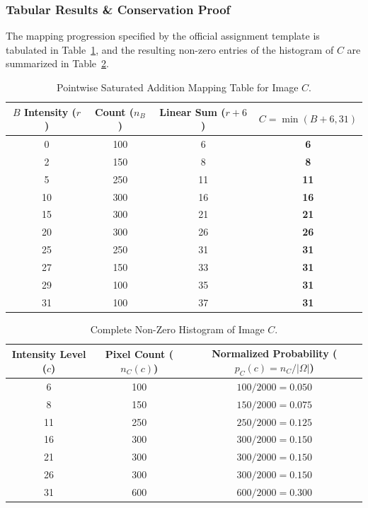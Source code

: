 \documentclass[11pt,a4paper]{article}
\begin{document}
\subsubsection{Tabular Results \& Conservation Proof}
The mapping progression specified by the official assignment template is tabulated in Table~\ref{tab:p1_mapping}, and the resulting non-zero entries of the histogram of $C$ are summarized in Table~\ref{tab:p1_hist_C}.

\begin{table}[htbp]
\centering
\caption{Pointwise Saturated Addition Mapping Table for Image $C$.}
\label{tab:p1_mapping}
\small
\begin{tabular}{cccc}
\toprule
\textbf{$B$ Intensity ($r$)} & \textbf{Count ($n_B$)} & \textbf{Linear Sum ($r + 6$)} & \textbf{$C = \min(B + 6, 31)$} \\
\midrule
0  & 100 & 6  & \textbf{6}  \\
2  & 150 & 8  & \textbf{8}  \\
5  & 250 & 11 & \textbf{11} \\
10 & 300 & 16 & \textbf{16} \\
15 & 300 & 21 & \textbf{21} \\
20 & 300 & 26 & \textbf{26} \\
25 & 250 & 31 & \textbf{31} \\
27 & 150 & 33 & \textbf{31} \\
29 & 100 & 35 & \textbf{31} \\
31 & 100 & 37 & \textbf{31} \\
\bottomrule
\end{tabular}
\end{table}

\begin{table}[htbp]
\centering
\caption{Complete Non-Zero Histogram of Image $C$.}
\label{tab:p1_hist_C}
\begin{tabular}{ccc}
\toprule
\textbf{Intensity Level ($c$)} & \textbf{Pixel Count ($n_C(c)$)} & \textbf{Normalized Probability ($p_C(c) = n_C / |\Omega|$)} \\
\midrule
6  & 100 & $100 / 2000 = 0.050$ \\
8  & 150 & $150 / 2000 = 0.075$ \\
11 & 250 & $250 / 2000 = 0.125$ \\
16 & 300 & $300 / 2000 = 0.150$ \\
21 & 300 & $300 / 2000 = 0.150$ \\
26 & 300 & $300 / 2000 = 0.150$ \\
31 & 600 & $600 / 2000 = 0.300$ \\
\bottomrule
\end{tabular}
\end{table}
\end{document}
